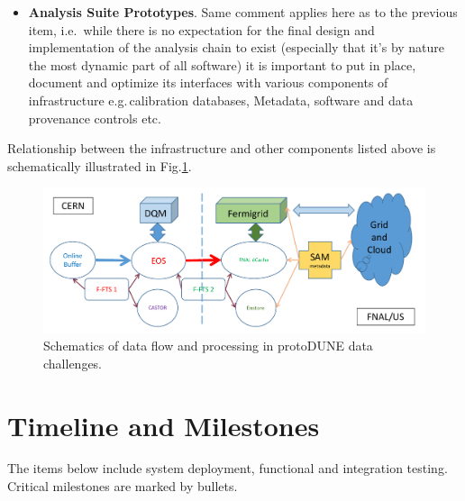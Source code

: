 \documentclass[pdftex,12pt,letter]{article}
\newcommand{\pd}{protoDUNE\xspace}
\begin{document}
\begin{itemize}
\item \textbf{Analysis Suite Prototypes}. Same comment applies here as to the previous item, i.e.\, while there is no expectation
for the final design and implementation of the analysis chain to exist (especially that it's by nature the most dynamic part of all
software) it is important to put in place, document and optimize its interfaces with various components of infrastructure e.g.\,calibration
databases, Metadata, software and data provenance controls etc.

\end{itemize}
\noindent Relationship between the infrastructure and other components listed above is schematically illustrated in
Fig.\ref{fig:dc1}.

\begin{figure}[tbh]
  \centering
  \includegraphics[width=1.0\textwidth]{figures/data_challenge_1.pdf}
  \caption{Schematics of data flow and  processing in \pd data challenges.}
  \label{fig:dc1}
\end{figure}

\section{Timeline and Milestones}
\label{sec:timeline}
The items below include system deployment, functional and integration testing.
Critical milestones are marked by bullets.
\end{document}

